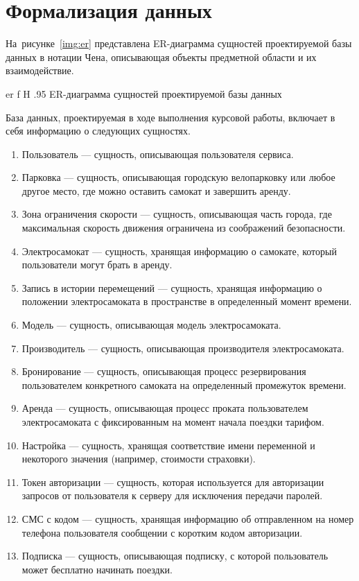 \pagebreak
\section{Формализация данных}

На~рисунке~\ref{img:er} представлена ER-диаграмма сущностей проектируемой базы данных в нотации Чена, описывающая объекты предметной области и их взаимодействие.

{er}
{f}
{H}
{.95\textwidth}
{ER-диаграмма сущностей проектируемой базы данных}

База данных, проектируемая в ходе выполнения курсовой работы, включает в себя информацию о следующих сущностях.

\begin{enumerate}
	\item Пользователь --- сущность, описывающая пользователя сервиса.
	\item Парковка --- сущность, описывающая городскую велопарковку или любое другое место, где можно оставить самокат и завершить аренду.
	\item Зона ограничения скорости --- сущность, описывающая часть города, где максимальная скорость движения ограничена из соображений безопасности.
	\item Электросамокат --- сущность, хранящая информацию о самокате, который пользователи могут брать в аренду.
	\item Запись в истории перемещений --- сущность, хранящая информацию о положении электросамоката в пространстве в определенный момент времени.
	\item Модель --- сущность, описывающая модель электросамоката.
	\item Производитель --- сущность, описывающая производителя электросамоката.
	\item Бронирование --- сущность, описывающая процесс резервирования пользователем конкретного самоката на определенный промежуток времени.
	\item Аренда --- сущность, описывающая процесс проката пользователем электросамоката с фиксированным на момент начала поездки тарифом.
	\item Настройка --- сущность, хранящая соответствие имени переменной и некоторого значения (например, стоимости страховки).
	\item Токен авторизации --- сущность, которая используется для авторизации запросов от пользователя к серверу для исключения передачи паролей.
	\item СМС с кодом --- сущность, хранящая информацию об отправленном на номер телефона пользователя сообщении с коротким кодом авторизации.
	\item Подписка --- сущность, описывающая подписку, с которой пользователь может бесплатно начинать поездки.
\end{enumerate}

